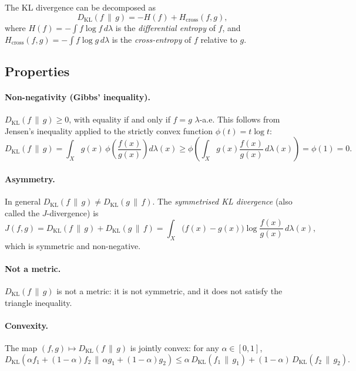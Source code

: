 \documentclass[12pt]{article}
\newcommand{\KL}[2]{D_{\mathrm{KL}}\!\left(#1\,\|\,#2\right)}
\begin{document}
The KL divergence can be decomposed as
\begin{equation}\label{eq:kl_entropy}
  \KL{f}{g} = -H(f) + H_{\mathrm{cross}}(f,g),
\end{equation}
where $H(f) = -\int f\log f\,d\lambda$ is the
\emph{differential entropy} of $f$, and
$H_{\mathrm{cross}}(f,g) = -\int f\log g\,d\lambda$ is the
\emph{cross-entropy} of $f$ relative to $g$.

\subsection{Properties}

\paragraph{Non-negativity (Gibbs' inequality).}
$\KL{f}{g} \geq 0$, with equality if and only if $f = g$
$\lambda$-a.e.  This follows from Jensen's inequality applied to
the strictly convex function $\phi(t) = t\log t$:
\begin{equation}\label{eq:gibbs}
  \KL{f}{g} = \int_X g(x)\,\phi\!\left(\frac{f(x)}{g(x)}\right)
  d\lambda(x) \geq \phi\!\left(\int_X g(x)
  \frac{f(x)}{g(x)}\,d\lambda(x)\right) = \phi(1) = 0.
\end{equation}

\paragraph{Asymmetry.}
In general $\KL{f}{g} \neq \KL{g}{f}$.  The
\emph{symmetrised KL divergence} (also called the $J$-divergence)
is
\begin{equation}\label{eq:j_div}
  J(f,g) = \KL{f}{g} + \KL{g}{f}
  = \int_X \bigl(f(x) - g(x)\bigr)\log\frac{f(x)}{g(x)}\,d\lambda(x),
\end{equation}
which is symmetric and non-negative.

\paragraph{Not a metric.}
$\KL{f}{g}$ is not a metric: it is not symmetric, and it does
not satisfy the triangle inequality.

\paragraph{Convexity.}
The map $(f,g) \mapsto \KL{f}{g}$ is jointly convex: for any
$\alpha \in [0,1]$,
\[
  \KL{\alpha f_1 + (1-\alpha)f_2}{\alpha g_1 + (1-\alpha)g_2}
  \leq \alpha\,\KL{f_1}{g_1} + (1-\alpha)\,\KL{f_2}{g_2}.
\]
\end{document}
